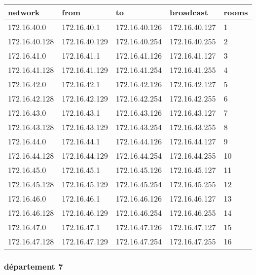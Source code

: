 \documentclass[11pt]{article}
\begin{document}
\begin{center}
\begin{tabular}{|l|l|l|l|l|}
\hline
network & from & to & broadcast & rooms \\
\hline
172.16.40.0 & 172.16.40.1 & 172.16.40.126 & 172.16.40.127 & 1 \\
\hline
172.16.40.128 & 172.16.40.129 & 172.16.40.254 & 172.16.40.255 & 2 \\
\hline
172.16.41.0 & 172.16.41.1 & 172.16.41.126 & 172.16.41.127 & 3 \\
\hline
172.16.41.128 & 172.16.41.129 & 172.16.41.254 & 172.16.41.255 & 4 \\
\hline
172.16.42.0 & 172.16.42.1 & 172.16.42.126 & 172.16.42.127 & 5 \\
\hline
172.16.42.128 & 172.16.42.129 & 172.16.42.254 & 172.16.42.255 & 6 \\
\hline
172.16.43.0 & 172.16.43.1 & 172.16.43.126 & 172.16.43.127 & 7 \\
\hline
172.16.43.128 & 172.16.43.129 & 172.16.43.254 & 172.16.43.255 & 8 \\
\hline
172.16.44.0 & 172.16.44.1 & 172.16.44.126 & 172.16.44.127 & 9 \\
\hline
172.16.44.128 & 172.16.44.129 & 172.16.44.254 & 172.16.44.255 & 10 \\
\hline
172.16.45.0 & 172.16.45.1 & 172.16.45.126 & 172.16.45.127 & 11 \\
\hline
172.16.45.128 & 172.16.45.129 & 172.16.45.254 & 172.16.45.255 & 12 \\
\hline
172.16.46.0 & 172.16.46.1 & 172.16.46.126 & 172.16.46.127 & 13 \\
\hline
172.16.46.128 & 172.16.46.129 & 172.16.46.254 & 172.16.46.255 & 14 \\
\hline
172.16.47.0 & 172.16.47.1 & 172.16.47.126 & 172.16.47.127 & 15 \\
\hline
172.16.47.128 & 172.16.47.129 & 172.16.47.254 & 172.16.47.255 & 16 \\
\hline
\end{tabular}
\end{center}

\subsubsection{département 7}
\label{sec:orgheadline11}
\end{document}
